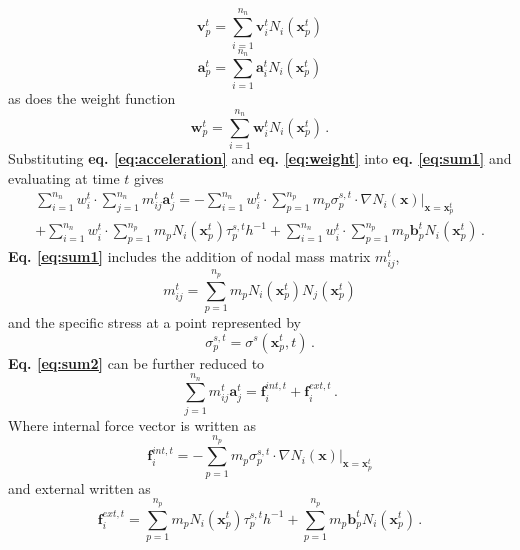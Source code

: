 \begin{equation}
\mathbf{v}_p^t = \sum_{i=1}^{n_n} \mathbf{v}_i^t N_i(\mathbf{x}_p^t)
\label{eq:velocity}
\end{equation}
\begin{equation}
\mathbf{a}_p^t = \sum_{i=1}^{n_n} \mathbf{a}_i^t N_i(\mathbf{x}_p^t)
\label{eq:acceleration}
\end{equation}
as does the weight function
\begin{equation}
\mathbf{w}_p^t = \sum_{i=1}^{n_n} \mathbf{w}_i^t N_i(\mathbf{x}_p^t) \,.
\label{eq:weight}
\end{equation}
Substituting {\bfseries eq. \ref{eq:acceleration}} and {\bfseries eq. \ref{eq:weight}} into {\bfseries eq. \ref{eq:sum1}} and evaluating at time $t$ gives
\begin{equation}
\begin{aligned}
\sum_{i=1}^{n_n}w_i^t \cdot \sum_{j=1}^{n_n}m_{ij}^t \mathbf{a}_j^t = -\sum_{i=1}^{n_n} w_i^t \cdot \sum_{p=1}^{n_p} m_p \sigma_p^{s,t} \cdot \nabla N_i(\mathbf{x}) \rvert_{\mathbf{x} = \mathbf{x}_p^t} \\ + \sum_{i=1}^{n_n}w_i^t \cdot \sum_{p=1}^{n_p} m_p N_i(\mathbf{x}_p^t)\tau_p^{s,t} h^{-1} + \sum_{i=1}^{n_n}w_i^t \cdot \sum_{p=1}^{n_p}m_p\mathbf{b}_p^t N_i(\mathbf{x}_p^t) \,.
\label{eq:sum2}
\end{aligned}
\end{equation}
{\bfseries Eq. \ref{eq:sum1}} includes the addition of nodal mass matrix $m_{ij}^t$, 
\begin{equation}
m_{ij}^t = \sum_{p=1}^{n_p} m_p N_i(\mathbf{x}_p^t)N_j(\mathbf{x}_p^t)
\label{eq:massmatrix}
\end{equation}
and the specific stress at a point represented by
\begin{equation}
\label{eq:specstress}
\sigma_p^{s,t} = \sigma^s(\mathbf{x}_p^t,t)\,.
\end{equation}
{\bfseries Eq. \ref{eq:sum2}} can be further reduced to
\begin{equation}
\label{eq:reduced1}
\sum_{j=1}^{n_n} m_{ij}^t\mathbf{a}_j^t = \mathbf{f}_i^{int,t} + \mathbf{f}_i^{ext,t} \,.
\end{equation}
Where internal force vector is written as
\begin{equation}
\mathbf{f}_i^{int,t} = -\sum_{p=1}^{n_p} m_p \sigma_p^{s,t} \cdot \nabla N_i(\mathbf{x}) \rvert_{\mathbf{x} = \mathbf{x}_p^t}
\label{eq:internal}
\end{equation}
and external written as
\begin{equation}
\mathbf{f}_i^{ext,t} = \sum_{p=1}^{n_p} m_p N_i(\mathbf{x}_p^t)\tau_p^{s,t} h^{-1} + \sum_{p=1}^{n_p}m_p\mathbf{b}_p^t N_i(\mathbf{x}_p^t) \,.
\label{eq:internal}
\end{equation}
